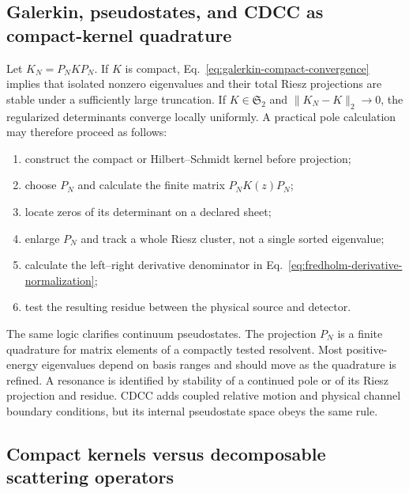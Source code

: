 \subsection{Galerkin, pseudostates, and CDCC as compact-kernel quadrature}
\label{subsec:fredholm-galerkin-cdcc}

Let $K_N=P_NKP_N$.  If $K$ is compact, Eq.~\eqref{eq:galerkin-compact-convergence}
implies that isolated nonzero eigenvalues and their total Riesz projections
are stable under a sufficiently large truncation.  If $K\in\mathfrak S_2$
and $\|K_N-K\|_2\to0$, the regularized determinants converge locally
uniformly.  A practical pole calculation may therefore proceed as follows:
\begin{enumerate}[label=\arabic*.]
  \item construct the compact or Hilbert--Schmidt kernel before projection;
  \item choose $P_N$ and calculate the finite matrix $P_NK(z)P_N$;
  \item locate zeros of its determinant on a declared sheet;
  \item enlarge $P_N$ and track a whole Riesz cluster, not a single sorted
  eigenvalue;
  \item calculate the left--right derivative denominator in
  Eq.~\eqref{eq:fredholm-derivative-normalization};
  \item test the resulting residue between the physical source and detector.
\end{enumerate}

The same logic clarifies continuum pseudostates.  The projection $P_N$ is a
finite quadrature for matrix elements of a compactly tested resolvent.  Most
positive-energy eigenvalues depend on basis ranges and should move as the
quadrature is refined.  A resonance is identified by stability of a
continued pole or of its Riesz projection and residue.  CDCC adds coupled
relative motion and physical channel boundary conditions, but its internal
pseudostate space obeys the same rule.

\subsection{Compact kernels versus decomposable scattering operators}
\label{subsec:compact-versus-direct-integral}

